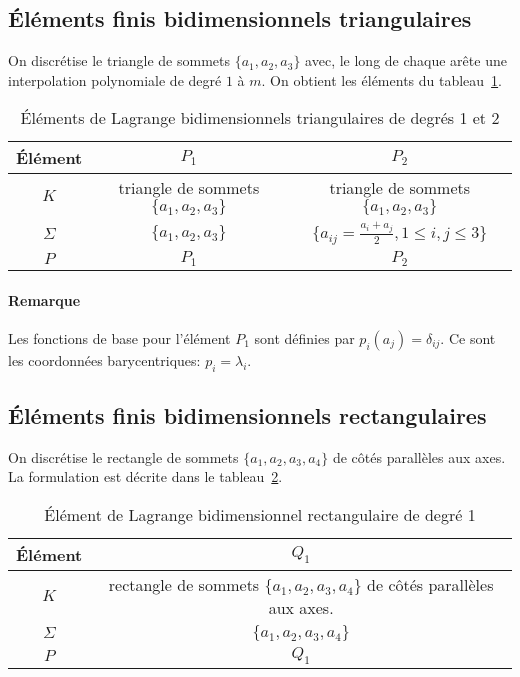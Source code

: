 \medskip
\subsection*{Éléments finis bidimensionnels triangulaires}
On discrétise le triangle de sommets $\{a_1, a_2, a_3\}$ avec, le long de chaque
arête une interpolation polynomiale de degré $1$ à $m$.
On obtient les éléments du tableau~\ref{tab:Elem:bi}.
\begin{table}[ht]\centering\small
\begin{tabular}{c|cc}
Élément & $P_1$ & $P_2$ \\
\hline
$K$	      & triangle de sommets $\{a_1, a_2, a_3\}$ & triangle de sommets $\{a_1, a_2, a_3\}$\\
$\Sigma$   & $\{a_1, a_2, a_3\}$ & $\{a_{ij}=\frac{a_i+a_j}2, 1\le i,j\le 3\}$ \\
$P$            & $P_1$ & $P_2$ \\
\hline
\end{tabular}
\caption{Éléments de Lagrange bidimensionnels triangulaires de degrés 1 et 2}\label{tab:Elem:bi}
\end{table}

\paragraph{Remarque}Les fonctions de base pour l'élément $P_1$ sont définies par $p_i(a_j) = \delta_{ij}$. Ce sont les coordonnées barycentriques: $p_i = \lambda_i$.

\medskip
\subsection*{Éléments finis bidimensionnels rectangulaires}
On discrétise le rectangle de sommets $\{a_1, a_2, a_3, a_4\}$ de côtés
parallèles aux axes. La formulation est décrite dans le tableau~\ref{tab:Elem:bibi}.
\begin{table}[ht]\centering\small
\begin{tabular}{c|c}
Élément & $Q_1$\\
\hline
$K$ & rectangle de sommets $\{a_1, a_2, a_3, a_4\}$ de côtés parallèles aux axes.\\
$\Sigma$ & $\{a_1, a_2, a_3, a_4\}$\\
$P$ & $Q_1$\\
\hline
\end{tabular}
\caption{Élément de Lagrange bidimensionnel rectangulaire de degré 1}\label{tab:Elem:bibi}
\end{table}

